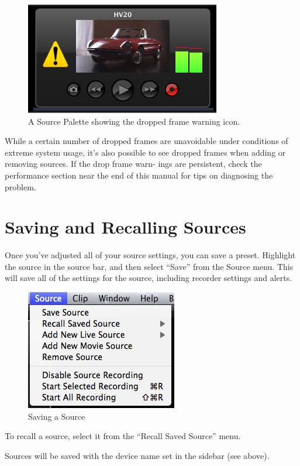 \documentclass[10,letterpaper,]{report}
\begin{document}
\begin{figure}[htbp]
\centering
\includegraphics{images/DroppedFrame.png}
\caption{A Source Palette showing the dropped frame warning icon.}
\end{figure}

While a certain number of dropped frames are unavoidable under
conditions of extreme system usage, it's also possible to see dropped
frames when adding or removing sources. If the drop frame warn- ings are
persistent, check the performance section near the end of this manual
for tips on diagnosing the problem.

\section{Saving and Recalling Sources}

Once you've adjusted all of your source settings, you can save a preset.
Highlight the source in the source bar, and then select ``Save'' from
the Source menu. This will save all of the settings for the source,
including recorder settings and alerts.

\begin{figure}[htbp]
\centering
\includegraphics{images/saveSource.png}
\caption{Saving a Source}
\end{figure}

To recall a source, select it from the ``Recall Saved Source'' menu.

Sources will be saved with the device name set in the sidebar (see
above).
\end{document}
